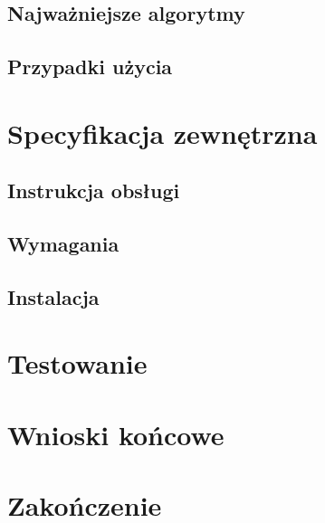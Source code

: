 \documentclass{book}
\begin{document}
		
		\section{Najważniejsze algorytmy}
		\section{Przypadki użycia}
		
		
	\chapter{Specyfikacja zewnętrzna}
		\section{Instrukcja obsługi}
		\section{Wymagania}
		\section{Instalacja}
		
	\chapter{Testowanie}
	
	\chapter{Wnioski końcowe}
	
	\chapter{Zakończenie}
	
	
	
	
	
\end{document}
